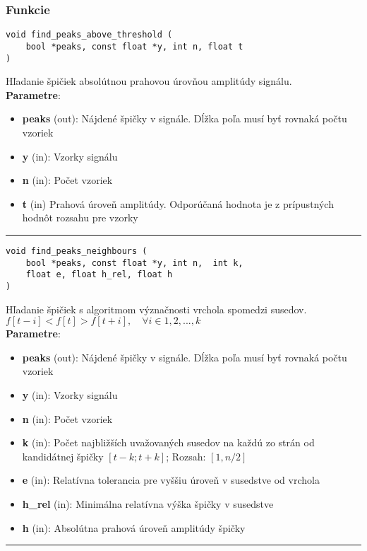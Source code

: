 \subsubsection*{Funkcie}
\begin{lstlisting}[style=docs]
void find_peaks_above_threshold (
    bool *peaks, const float *y, int n, float t
) 
\end{lstlisting}
    Hľadanie špičiek absolútnou prahovou úrovňou amplitúdy signálu. \\
\textbf{Parametre}:
\begin{itemize}[noitemsep, topsep=0pt]
	\item \textbf{peaks} (out): Nájdené špičky v signále. Dĺžka poľa musí byť rovnaká počtu vzoriek
	\item \textbf{y} (in): Vzorky signálu 
	\item \textbf{n} (in): Počet vzoriek 
	\item \textbf{t} (in) Prahová úroveň amplitúdy. Odporúčaná hodnota je z prípustných hodnôt rozsahu pre vzorky 
\end{itemize}
\bigbreak
\hrule

\begin{lstlisting}[style=docs]
void find_peaks_neighbours (
    bool *peaks, const float *y, int n,  int k, 
    float e, float h_rel, float h
)
\end{lstlisting}
   Hľadanie špičiek s algoritmom význačnosti vrchola spomedzi susedov. \\ $ f[t-i] < f[t] > f[t+i],\quad \forall i \in 1, 2, ..., k $ \\
\textbf{Parametre}:
\begin{itemize}[noitemsep, topsep=0pt]
	\item \textbf{peaks} (out): Nájdené špičky v signále. Dĺžka poľa musí byť rovnaká počtu vzoriek
	\item \textbf{y} (in): Vzorky signálu 
	\item \textbf{n} (in): Počet vzoriek 
	\item \textbf{k} (in): Počet najbližších uvažovaných susedov na každú zo strán od kandidátnej špičky $[t-k; t+k]$;  Rozsah: $[1, n / 2]$
	\item \textbf{e} (in): Relatívna tolerancia pre vyššiu úroveň v susedstve od vrchola
	\item \textbf{h\_rel} (in): Minimálna relatívna výška špičky v susedstve
 	\item \textbf{h} (in): Absolútna prahová úroveň amplitúdy špičky
\end{itemize}
\bigbreak
\hrule

